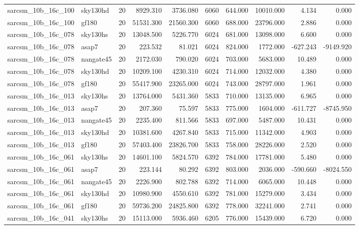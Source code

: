 \documentclass{article}
\begin{document}
\begin{longtable}{llrrrrrrrr}
sarcsm\_10b\_16c\_100 & sky130hd & 20 & 8929.310 & 3736.080 & 6060 & 644.000 & 10010.000 & 4.134 & 0.000 \\
sarcsm\_10b\_16c\_100 & gf180 & 20 & 51531.300 & 21560.300 & 6060 & 688.000 & 23796.000 & 2.886 & 0.000 \\
sarcsm\_10b\_16c\_078 & sky130hs & 20 & 13048.500 & 5226.770 & 6024 & 681.000 & 13098.000 & 6.600 & 0.000 \\
sarcsm\_10b\_16c\_078 & asap7 & 20 & 223.532 & 81.021 & 6024 & 824.000 & 1772.000 & -627.243 & -9149.920 \\
sarcsm\_10b\_16c\_078 & nangate45 & 20 & 2172.030 & 790.020 & 6024 & 703.000 & 5683.000 & 10.489 & 0.000 \\
sarcsm\_10b\_16c\_078 & sky130hd & 20 & 10209.100 & 4230.310 & 6024 & 714.000 & 12032.000 & 4.380 & 0.000 \\
sarcsm\_10b\_16c\_078 & gf180 & 20 & 55417.900 & 23265.000 & 6024 & 743.000 & 28797.000 & 1.961 & 0.000 \\
sarcsm\_10b\_16c\_013 & sky130hs & 20 & 13764.000 & 5431.360 & 5833 & 710.000 & 13135.000 & 6.965 & 0.000 \\
sarcsm\_10b\_16c\_013 & asap7 & 20 & 207.360 & 75.597 & 5833 & 775.000 & 1604.000 & -611.727 & -8745.950 \\
sarcsm\_10b\_16c\_013 & nangate45 & 20 & 2235.400 & 811.566 & 5833 & 697.000 & 5487.000 & 10.431 & 0.000 \\
sarcsm\_10b\_16c\_013 & sky130hd & 20 & 10381.600 & 4267.840 & 5833 & 715.000 & 11342.000 & 4.903 & 0.000 \\
sarcsm\_10b\_16c\_013 & gf180 & 20 & 57403.400 & 23826.700 & 5833 & 758.000 & 28226.000 & 2.520 & 0.000 \\
sarcsm\_10b\_16c\_061 & sky130hs & 20 & 14601.100 & 5824.570 & 6392 & 784.000 & 17781.000 & 5.480 & 0.000 \\
sarcsm\_10b\_16c\_061 & asap7 & 20 & 223.144 & 80.292 & 6392 & 803.000 & 2036.000 & -590.660 & -8024.550 \\
sarcsm\_10b\_16c\_061 & nangate45 & 20 & 2226.900 & 802.788 & 6392 & 714.000 & 6065.000 & 10.448 & 0.000 \\
sarcsm\_10b\_16c\_061 & sky130hd & 20 & 10980.900 & 4550.610 & 6392 & 781.000 & 15279.000 & 3.434 & 0.000 \\
sarcsm\_10b\_16c\_061 & gf180 & 20 & 59736.200 & 24825.800 & 6392 & 778.000 & 32241.000 & 2.741 & 0.000 \\
sarcsm\_10b\_16c\_041 & sky130hs & 20 & 15113.000 & 5936.460 & 6205 & 776.000 & 15439.000 & 6.720 & 0.000 \\

\end{longtable}
\end{document}
